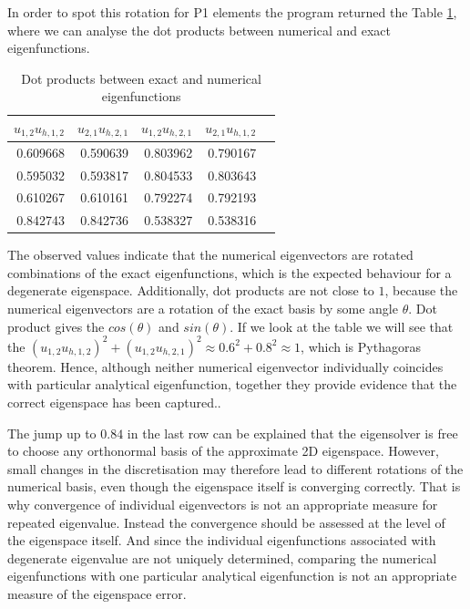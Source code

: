 \documentclass[conference]{IEEEtran}
\begin{document}
In order to spot this rotation for P1 elements the program returned the Table \ref{tab:dot products}, where we can analyse the dot products between numerical and exact eigenfunctions.
\begin{table}[H]
    \centering
    \caption{Dot products between exact and numerical eigenfunctions}
    \label{tab:dot products}
    \begin{tabular}{rrrrr}
        \toprule
        $u_{1,2} u_{h,1,2}$ & $u_{2,1} u_{h,2,1}$ & $u_{1,2} u_{h,2,1}$ & $u_{2,1} u_{h,1,2}$ \\
        \midrule
        0.609668 & 0.590639 & 0.803962 & 0.790167 \\
        0.595032 & 0.593817 & 0.804533 & 0.803643 \\
        0.610267 & 0.610161 & 0.792274 & 0.792193 \\
        0.842743 & 0.842736 & 0.538327 & 0.538316 \\
        \bottomrule
    \end{tabular}
\end{table}

The observed values indicate that the numerical eigenvectors are rotated combinations of the exact eigenfunctions, which is the expected behaviour for a degenerate eigenspace.
Additionally, dot products are not close to $1$, because the numerical eigenvectors are a rotation of the exact basis by some angle $\theta$. Dot product gives the $cos(\theta)$ and $sin(\theta)$. If we look at the table we will see that the $(u_{1,2} u_{h,1,2})^2 + (u_{1,2} u_{h,2,1})^2 \approx 0.6^2 + 0.8^2 \approx 1$, which is Pythagoras theorem. Hence, although neither numerical eigenvector individually coincides with particular analytical eigenfunction, together they provide evidence that the correct eigenspace has been captured.. 

The jump up to $0.84$ in the last row can be explained that the eigensolver is free to choose any orthonormal basis of the approximate 2D eigenspace.
However, small changes in the discretisation may therefore lead to different rotations of the numerical basis, even though the eigenspace itself is converging correctly. That is why convergence of individual eigenvectors is not an appropriate measure for repeated eigenvalue. Instead the convergence should be assessed at the level of the eigenspace itself.
And since the individual eigenfunctions associated with degenerate eigenvalue are not uniquely determined, comparing the numerical eigenfunctions with one particular analytical eigenfunction is not an appropriate measure of the eigenspace error.
\end{document}
